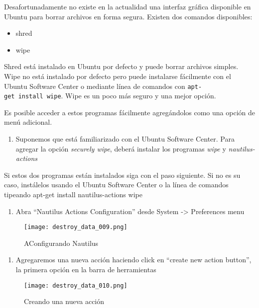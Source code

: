 \documentclass[10pt,a5paper,twoside,,]{book}
\providecommand{\tightlist}{%
  \setlength{\itemsep}{0pt}\setlength{\parskip}{0pt}}
\begin{document}
Desafortunadamente no existe en la actualidad una interfaz gráfica
disponible en Ubuntu para borrar archivos en forma segura. Existen dos
comandos disponibles:

\begin{itemize}
\tightlist
\item
  shred
\item
  wipe
\end{itemize}

Shred está instalado en Ubuntu por defecto y puede borrar archivos
simples. Wipe no está instalado por defecto pero puede instalarse
fácilmente con el Ubuntu Software Center o mediante línea de comandos
con \texttt{apt-get\ install\ wipe}. Wipe es un poco más seguro y una
mejor opción.

Es posible acceder a estos programas fácilmente agregándolos como una
opción de menú adicional.

\begin{enumerate}
\def\labelenumi{\arabic{enumi}.}
\tightlist
\item
  Suponemos que está familiarizado con el Ubuntu Software Center. Para
  agregar la opción \emph{securely wipe}, deberá instalar los programas
  \emph{wipe} y \emph{nautilus-actions}
\end{enumerate}

Si estos dos programas están instalados siga con el paso siguiente. Si
no es su caso, instálelos usando el Ubuntu Software Center o la línea de
comandos tipeando apt-get install nautilus-actions wipe

\begin{enumerate}
\def\labelenumi{\arabic{enumi}.}
\setcounter{enumi}{1}
\tightlist
\item
  Abra ``Nautilus Actions Configuration'' desde System -\textgreater{}
  Preferences menu
\end{enumerate}

\begin{figure}[htbp]
\centering
\texttt{[image: destroy\_data\_009.png]}
\caption{AConfigurando Nautilus}
\end{figure}

\begin{enumerate}
\def\labelenumi{\arabic{enumi}.}
\setcounter{enumi}{2}
\tightlist
\item
  Agregaremos una nueva acción haciendo click en ``create new action
  button'', la primera opción en la barra de herramientas
\end{enumerate}

\begin{figure}[htbp]
\centering
\texttt{[image: destroy\_data\_010.png]}
\caption{Creando una nueva acción}
\end{figure}
\end{document}
